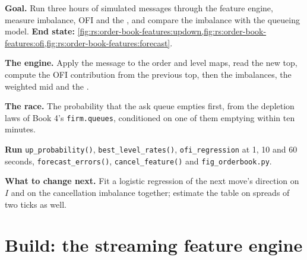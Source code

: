 \begin{tutorial}
\textbf{Goal.} Run three hours of simulated messages through the feature engine, measure imbalance, OFI and the , and compare the
imbalance with the queueing model. \textbf{End state:}
\cref{fig:rs:order-book-features:updown,fig:rs:order-book-features:ofi,fig:rs:order-book-features:forecast}.
\begin{tutsteps}
\item \textbf{The engine.} Apply the message to the order and level maps, read the new top, compute the OFI contribution from the previous
top, then the imbalances, the weighted mid and the .
\label{lst:rs:order-book-features:engine}
\item \textbf{The race.} The probability that the ask queue empties first, from the depletion laws of Book 4's \texttt{firm.queues},
conditioned on one of them emptying within ten minutes.
\label{lst:rs:order-book-features:race}
\item \textbf{Run} \texttt{up\_probability()}, \texttt{best\_level\_rates()}, \texttt{ofi\_regression} at 1, 10 and 60 seconds,
\texttt{forecast\_errors()}, \texttt{cancel\_feature()} and \texttt{fig\_orderbook.py}.
\end{tutsteps}
\textbf{What to change next.} Fit a logistic regression of the next move's direction on $I$ and on the cancellation imbalance together;
estimate the  table on spreads of two ticks as well.
\end{tutorial}

\section{Build: the streaming feature engine}\label{bld:rs:order-book-features:lobfeat}

